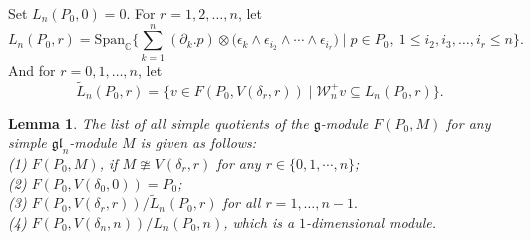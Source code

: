 \documentclass[12pt, a4paper]{amsart}
\newcommand{\fg}{\mathfrak g}
\newcommand{\C}{\mathbb{C}}
\def\gl{\mathfrak{gl}}
\theoremstyle{Theorem}
\theoremstyle{Theorem}
\newtheorem{lemma}[thm]{Lemma}
\numberwithin{equation}{section}
\begin{document}


Set $L_{n}(P_{0},0)=0$. For $r=1,2,\dots,n$, let \[L_n(P_{0},r)=\text{Span}_{\C}
\Big\{\sum_{k=1}^{n}(\partial_{k}.p)\otimes\big(\epsilon_{k}
\wedge\epsilon_{i_2}\wedge\cdots\wedge\epsilon_{i_r}\big)\mid p\in P_{0},\ 1\leq i_2,i_{3},\dots,i_r\leq n\Big\}.\]
And for $r=0,1,\dots,n$, let
\[\tilde{L}_n(P_{0},r)=\{v\in F(P_{0},V(\delta_r,r))\mid {\mathcal W}_n^+ v\subseteq L_n(P_{0},r)\}.\]




\begin{lemma}\label{Useful-lem}
The list of all simple quotients of the $\fg$-module $F(P_0,M)$ for any simple $\gl_{n}$-module $M$ is given as follows:\\
(1) $F(P_0,M)$,
if $M \ncong V(\delta_{r},r)$ for any $r\in\{0,1,\cdots,n\}$;\\
(2) $F(P_0,V(\delta_{0},0))=P_0$;\\
(3)  $F(P_{0},V(\delta_{r},r))\big/
\tilde{L}_{n}(P_{0},r)$  for all $r=1,\ldots,n-1.$\\
(4) $F(P_{0},V(\delta_{n},n))/L_{n}(P_{0},n)$, which  is a $1$-dimensional module.
\end{lemma}
\end{document}
